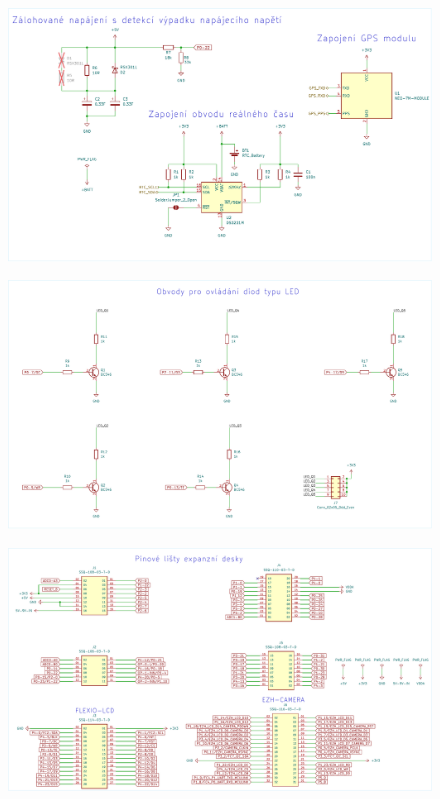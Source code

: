 
\begin{figure}[H]
    \centering
    \includegraphics[width=0.95\textheight, angle=90]{obrazky-figures/circuits.pdf}
\end{figure}


\begin{figure}[H]
    \centering
    \includegraphics[width=1.00\textheight, angle=90]{obrazky-figures/diodes.pdf}
\end{figure}


\begin{figure}[H]
    \centering
    \includegraphics[width=1.00\textheight, angle=90]{obrazky-figures/pin-headers.pdf}
\end{figure}

